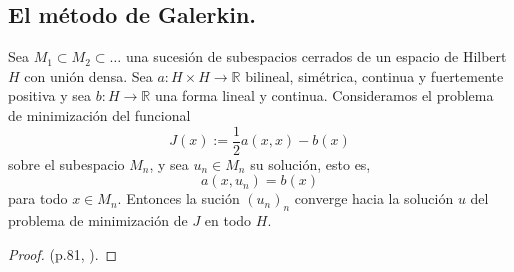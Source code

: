 \subsection{El método de Galerkin.}

\begin{theorem}
  Sea $M_1\subset M_2 \subset \ldots$ una sucesión de subespacios cerrados de un
  espacio de Hilbert $H$ con unión densa. Sea $a:H\times H\to \mathbb{R}$ 
  bilineal, simétrica, continua y fuertemente positiva y sea $b:H\to \mathbb{R}$ 
  una forma lineal y continua. Consideramos el problema de minimización del
  funcional
  \[
  J(x):=\frac{1}{2}a(x,x)-b(x)
  \] 
  sobre el subespacio $M_n$, y sea $u_n\in M_n$ su solución, esto es,
  \[
  a(x,u_n)=b(x)
  \] 
  para todo $x\in M_n$. Entonces la sución $(u_n)_n$ converge hacia la solución
  $u$ del problema de minimización de $J$ en todo $H$.
\end{theorem}
\begin{proof}
  (p.81, \cite{cascales2012}).
\end{proof}
